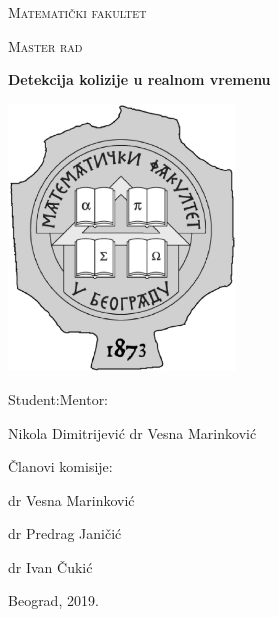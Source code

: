 \documentclass{article}
\begin{document}
\begin{titlepage} 
	\centering
	{\scshape\LARGE Matematički fakultet \par}
	\vspace{1cm}
	{\scshape Master rad\par}
	\vspace{0.5cm}
	{\huge\bfseries Detekcija kolizije u realnom vremenu\par}
	\vspace{0.5cm}
    \includegraphics[width=0.45\textwidth]{logo-matf.jpg}\par\vspace{1cm}
    Student:\hfill Mentor: \par
	{ Nikola Dimitrijević} \hfill dr Vesna Marinković
	\vfill
    
	\vfill
    
	Članovi komisije:\par
	dr Vesna Marinković \par
    dr Predrag Janičić\par
    dr Ivan Čukić
	\vfill

	{\large Beograd, 2019. \par}
\end{titlepage}
\end{document}
